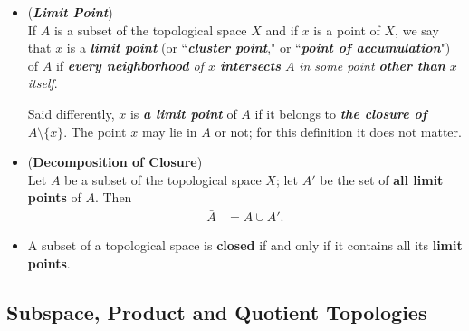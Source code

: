 \documentclass[11pt]{article}
\begin{document}
\begin{itemize}
\item \begin{definition} (\emph{\textbf{Limit Point}})\\
If $A$ is a subset of the topological space $X$ and if $x$ is a point of $X$, we say that $x$ is a \underline{\emph{\textbf{limit point}}} (or ``\emph{\textbf{cluster point}}," or ``\emph{\textbf{point of accumulation}}") of $A$ if \emph{\textbf{every neighborhood} of $x$ \textbf{intersects} $A$} \emph{in some point \textbf{other than} $x$ itself}. 

Said differently, $x$ is \emph{\textbf{a limit point}} of $A$ if it belongs to \emph{\textbf{the closure of $A \setminus \{x\}$}}. The point $x$ may lie in $A$ or not; for this definition it does not matter.
\end{definition}

\item \begin{theorem} (\textbf{Decomposition of Closure})\\
Let $A$ be a subset of the topological space $X$; let $A'$ be the set of \textbf{all limit points} of $A$. Then
\begin{align*}
\bar{A} &= A \cup A'.
\end{align*}
\end{theorem}

\item \begin{corollary}
A subset of a topological space is \textbf{closed} if and only if it contains all its \textbf{limit points}.
\end{corollary}
\end{itemize}

\subsection{Subspace, Product and Quotient Topologies}
\end{document}
